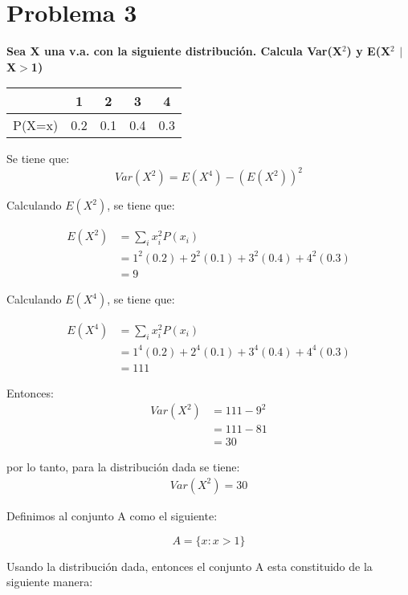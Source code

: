 \section*{Problema 3}
\textbf{Sea X una v.a. con la siguiente distribución. Calcula Var(X$^2$) y E(X$^2$ $|$ X$>$1)}
\begin{table}[H]
    \centering
    \begin{tabular}{l|cccc}
               & 1   & 2   & 3   & 4   \\ \hline
        P(X=x) & 0.2 & 0.1 & 0.4 & 0.3
    \end{tabular}
\end{table}

Se tiene que:
\begin{equation}
    Var(X^2) = E(X^4)- (E(X^2))^2
\end{equation}

Calculando $E(X^2)$, se tiene que:

\begin{align*}
    E(X^2) & =  \sum_i x_i^2 P(x_i)                       \\
           & = 1^2(0.2) + 2^2(0.1) + 3^2 (0.4) + 4^2(0.3) \\
           & = 9
\end{align*}

Calculando $E(X^4)$, se tiene que:

\begin{align*}
    E(X^4) & =  \sum_i x_i^2 P(x_i)                       \\
           & = 1^4(0.2) + 2^4(0.1) + 3^4 (0.4) + 4^4(0.3) \\
           & = 111
\end{align*}

Entonces:
\begin{align*}
    Var(X^2) & = 111 - 9^2 \\
             & = 111-81    \\
             & =30
\end{align*}

por lo tanto, para la distribución dada se tiene:
\begin{align*}
    Var(X^2) = 30
\end{align*}


Definimos al conjunto A como el siguiente:

\begin{equation}
    A = \{x : x>1 \}
\end{equation}

Usando la distribución dada, entonces el conjunto A esta constituido de la siguiente manera:

